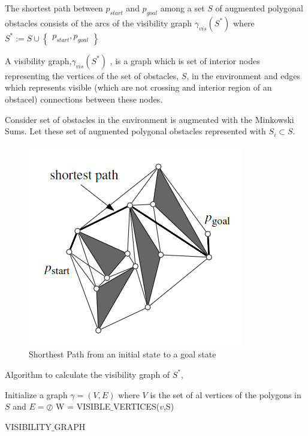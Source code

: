 \begin{displayquote}
The shortest path between $p_{start}$ and $p_{goal}$ among a set $S$ of augmented polygonal obstacles consists of the arcs of the visibility graph $\gamma_{vis}(S^*)$ where $S^* := S \cup \begin{Bmatrix}
p_{start}, p_{goal}
\end{Bmatrix}$
\end{displayquote}

A visibility graph,$\gamma_{vis}(S^*)$ , is a graph which is set of interior nodes representing the vertices of the set of obstacles, $S$, in the environment and edges which represents visible (which are not crossing and interior region of an obstacel) connections between these nodes. 

Consider set of obstacles in the environment is augmented with the Minkowski Sums. Let these set of augmented polygonal obstacles represented with $S_i \subset S$. 

\begin{figure}[H]
\caption{Shorthest Path from an initial state to a goal state}
\centering
\includegraphics[scale = 0.4]{shortest}
\end{figure} 

Algorithm to calculate the visibility graph of $S^*$,
	
\begin{algorithm}[H]
Initialize a graph $\gamma = (V,E)$ where $V$ is the set of al vertices of the polygons in $S$ and $E = \oslash$ 
{		
W = VISIBLE$\_$VERTICES($v$,S)\;}
\caption{VISIBILITY$\_$GRAPH}
\end{algorithm}

